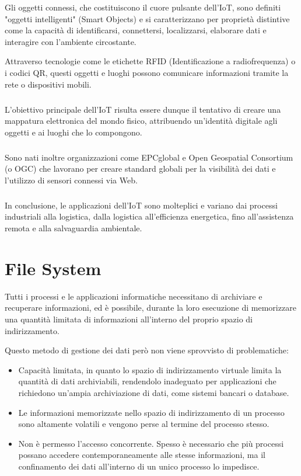 \documentclass[12pt,a4paper,openright,twoside]{book}
\begin{document}
        Gli oggetti connessi, che costituiscono il cuore pulsante dell’\ac{IoT}, sono definiti "oggetti intelligenti" (Smart Objects) e si caratterizzano per proprietà distintive come la capacità di identificarsi, connettersi, localizzarsi, elaborare dati e interagire con l'ambiente circostante.

        Attraverso tecnologie come le etichette RFID (Identificazione a radiofrequenza) o i codici QR, questi oggetti e luoghi possono comunicare informazioni tramite la rete o dispositivi mobili.

        \subparagraph*{}

        L'obiettivo principale dell’\ac{IoT} risulta essere dunque il tentativo di creare una mappatura elettronica del mondo fisico, attribuendo un’identità digitale agli oggetti e ai luoghi che lo compongono.

        \subparagraph*{}

        Sono nati inoltre organizzazioni come EPCglobal e Open Geospatial Consortium (o OGC) che lavorano per creare standard globali per la visibilità dei dati e l’utilizzo di sensori connessi via Web.

        \subparagraph*{}

        In conclusione, le applicazioni dell’\ac{IoT} sono molteplici e variano dai processi industriali alla logistica, dalla logistica all’efficienza energetica, fino all’assistenza remota e alla salvaguardia ambientale.

        \cite{uckelmann2011architecting}\cite{hersent2011internet}\cite{chaouchi2013internet}

    \section{File System}

        Tutti i processi e le applicazioni informatiche necessitano di archiviare e recuperare informazioni, ed è possibile, durante la loro esecuzione di memorizzare una quantità limitata di informazioni all'interno del proprio spazio di indirizzamento.

        Questo metodo di gestione dei dati però non viene sprovvisto di problematiche:

        \begin{itemize}
            \item Capacità limitata, in quanto lo spazio di indirizzamento virtuale limita la quantità di dati archiviabili, rendendolo inadeguato per applicazioni che richiedono un'ampia archiviazione di dati, come sistemi bancari o database.
            \item Le informazioni memorizzate nello spazio di indirizzamento di un processo sono altamente volatili e vengono perse al termine del processo stesso.
            \item Non è permesso l'accesso concorrente. Spesso è necessario che più processi possano accedere contemporaneamente alle stesse informazioni, ma il confinamento dei dati all'interno di un unico processo lo impedisce.
        \end{itemize}
\end{document}
